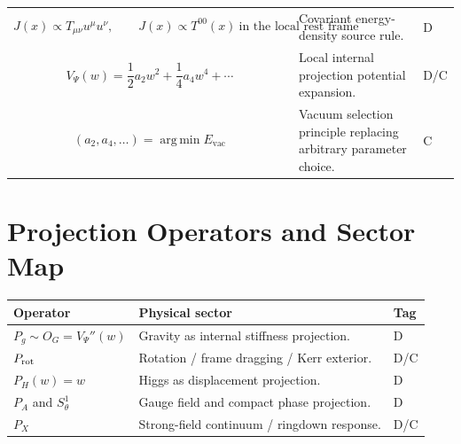 \documentclass[11pt]{article}
\newcommand{\vac}{\mathrm{vac}}
\begin{document}
\begin{longtable}{>{\raggedright\arraybackslash}p{} >{\raggedright\arraybackslash}p{} >{\centering\arraybackslash}p{}}
\begin{equation}
J(x)\propto T_{\mu\nu}u^\mu u^\nu,
\qquad J(x)\propto T^{00}(x)\ \text{in the local rest frame}
\end{equation}
& Covariant energy-density source rule. & D \\

\begin{equation}
V_\Psi(w)=\frac12a_2w^2+\frac14a_4w^4+\cdots
\end{equation}
& Local internal projection potential expansion. & D/C \\

\begin{equation}
(a_2,a_4,\ldots)=\operatorname*{arg\,min}E_{\vac}
\end{equation}
& Vacuum selection principle replacing arbitrary parameter choice. & C \\

\bottomrule
\end{longtable}

\section{Projection Operators and Sector Map}
\begin{longtable}{>{\raggedright\arraybackslash}p{} >{\raggedright\arraybackslash}p{} >{\centering\arraybackslash}p{}}
\toprule
\textbf{Operator} & \textbf{Physical sector} & \textbf{Tag} \\
\midrule
\endhead
$P_g\sim O_G=V_\Psi''(w)$ & Gravity as internal stiffness projection. & D \\
$P_{\rm rot}$ & Rotation / frame dragging / Kerr exterior. & D/C \\
$P_H(w)=w$ & Higgs as displacement projection. & D \\
$P_A$ and $S^1_\theta$ & Gauge field and compact phase projection. & D \\
$P_X$ & Strong-field continuum / ringdown response. & D/C \\
\bottomrule
\end{longtable}
\end{document}
